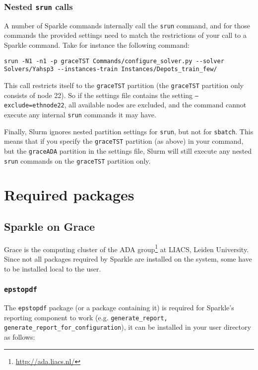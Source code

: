 \documentclass{article}
\begin{document}
\subsubsection{Nested \texttt{srun} calls}
A number of Sparkle commands internally call the \texttt{srun} command, and for those commands the provided settings need to match the restrictions of your call to a Sparkle command. Take for instance the following command:

\begin{lstlisting}[breaklines]
srun -N1 -n1 -p graceTST Commands/configure_solver.py --solver Solvers/Yahsp3 --instances-train Instances/Depots_train_few/
\end{lstlisting}

This call restricts itself to the \texttt{graceTST} partition (the \texttt{graceTST} partition only consists of node 22). So if the settings file contains the setting \texttt{--exclude=ethnode22}, all available nodes are excluded, and the command cannot execute any internal \texttt{srun} commands it may have.

Finally, Slurm ignores nested partition settings for \texttt{srun}, but not for \texttt{sbatch}. This means that if you specify the \texttt{graceTST} partition (as above) in your command, but the \texttt{graceADA} partition in the settings file, Slurm will still execute any nested \texttt{srun} commands on the \texttt{graceTST} partition only.

\section{Required packages}

\subsection{Sparkle on Grace}

Grace is the computing cluster of the ADA group\footnote{\url{http://ada.liacs.nl/}} at LIACS, Leiden University. Since not all packages required by Sparkle are installed on the system, some have to be installed local to the user.

\subsubsection{\texttt{epstopdf}}
\label{package:epstopdf}

The \texttt{epstopdf} package (or a package containing it) is required for Sparkle's reporting component to work (e.g. \texttt{generate\_report, generate\_report\_for\_configuration}), it can be installed in your user directory as follows:
\end{document}
